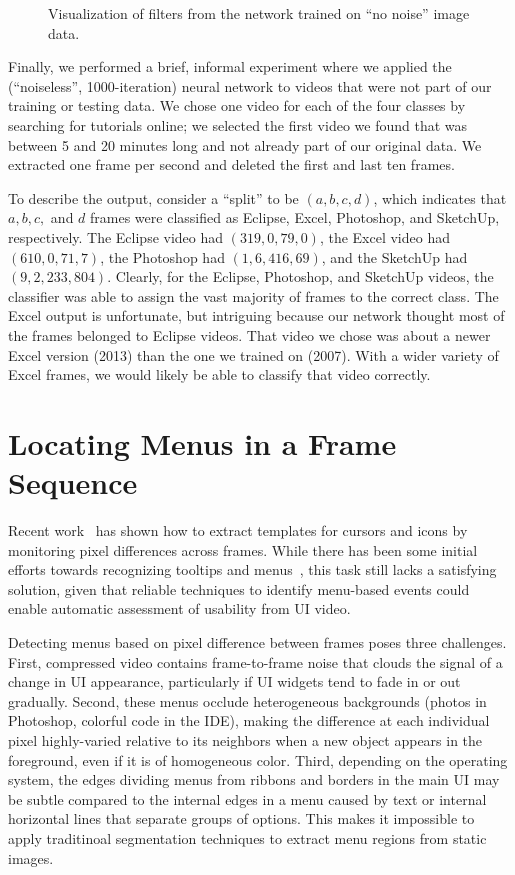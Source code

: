 \documentclass[10pt]{article}
\begin{document}
\begin{figure}[t]
\begin{minipage}{.35\textwidth}
  \caption{Visualization of filters from the network trained on ``no noise'' image data.}
  \label{fig:filters_nonoise}
  \end{minipage}
\end{figure}

Finally, we performed a brief, informal experiment where we applied the (``noiseless'',
1000-iteration) neural network to videos that were not part of our training or testing data. We
chose one video for each of the four classes by searching for tutorials online; we selected the
first video we found that was between 5 and 20 minutes long and not already part of our original
data. We extracted one frame per second and deleted the first and last ten frames.

To describe the output, consider a ``split'' to be $(a,b,c,d)$, which indicates that $a, b, c,$ and
$d$ frames were classified as Eclipse, Excel, Photoshop, and SketchUp, respectively.  The Eclipse
video had $(319,0,79,0)$, the Excel video had $(610,0,71,7)$, the Photoshop had $(1,6,416,69)$, and
the SketchUp had $(9,2,233,804)$. Clearly, for the Eclipse, Photoshop, and SketchUp videos, the
classifier was able to assign the vast majority of frames to the correct class. The Excel output is
unfortunate, but intriguing because our network thought most of the frames belonged to Eclipse
videos. That video we chose was about a newer Excel version (2013) than the one we trained on
(2007).  With a wider variety of Excel frames, we would likely be able to classify that video
correctly.

\section{Locating Menus in a Frame Sequence}\label{andrew}

Recent work~\cite{banovic_waken_2012} has shown how to extract templates for cursors and icons by
monitoring pixel differences across frames.  While there has been some initial efforts
towards recognizing tooltips and menus~\cite{banovic_waken_2012}, this task still lacks a
satisfying solution, given that reliable techniques to identify menu-based events could enable
automatic assessment of usability from UI video.

Detecting menus based on pixel difference between frames poses three challenges.  First, compressed 
video contains frame-to-frame noise that clouds the signal of a change in UI appearance, 
particularly if UI widgets tend to fade in or out gradually.  Second, these menus occlude
heterogeneous backgrounds (photos in Photoshop, colorful code in the IDE), making the difference
at each individual pixel highly-varied relative to its neighbors when a new object appears in the
foreground, even if it is of homogeneous color.  Third, depending on the operating system, 
the edges dividing menus from ribbons and borders in the main UI may be subtle compared to the
internal edges in a menu caused by text or internal horizontal lines that separate groups of options.
This makes it impossible to apply traditinoal segmentation techniques to extract menu regions from 
static images.
\end{document}
